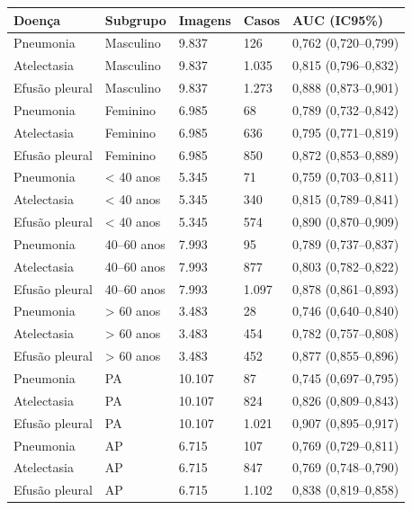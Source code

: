 \begin{tabular}{lllll}
\toprule
Doença & Subgrupo & Imagens & Casos & AUC (IC95\%) \\
\midrule
Pneumonia & Masculino & 9.837 & 126 & 0,762 (0,720–0,799) \\
Atelectasia & Masculino & 9.837 & 1.035 & 0,815 (0,796–0,832) \\
Efusão pleural & Masculino & 9.837 & 1.273 & 0,888 (0,873–0,901) \\
Pneumonia & Feminino & 6.985 & 68 & 0,789 (0,732–0,842) \\
Atelectasia & Feminino & 6.985 & 636 & 0,795 (0,771–0,819) \\
Efusão pleural & Feminino & 6.985 & 850 & 0,872 (0,853–0,889) \\
Pneumonia & < 40 anos & 5.345 & 71 & 0,759 (0,703–0,811) \\
Atelectasia & < 40 anos & 5.345 & 340 & 0,815 (0,789–0,841) \\
Efusão pleural & < 40 anos & 5.345 & 574 & 0,890 (0,870–0,909) \\
Pneumonia & 40–60 anos & 7.993 & 95 & 0,789 (0,737–0,837) \\
Atelectasia & 40–60 anos & 7.993 & 877 & 0,803 (0,782–0,822) \\
Efusão pleural & 40–60 anos & 7.993 & 1.097 & 0,878 (0,861–0,893) \\
Pneumonia & > 60 anos & 3.483 & 28 & 0,746 (0,640–0,840) \\
Atelectasia & > 60 anos & 3.483 & 454 & 0,782 (0,757–0,808) \\
Efusão pleural & > 60 anos & 3.483 & 452 & 0,877 (0,855–0,896) \\
Pneumonia & PA & 10.107 & 87 & 0,745 (0,697–0,795) \\
Atelectasia & PA & 10.107 & 824 & 0,826 (0,809–0,843) \\
Efusão pleural & PA & 10.107 & 1.021 & 0,907 (0,895–0,917) \\
Pneumonia & AP & 6.715 & 107 & 0,769 (0,729–0,811) \\
Atelectasia & AP & 6.715 & 847 & 0,769 (0,748–0,790) \\
Efusão pleural & AP & 6.715 & 1.102 & 0,838 (0,819–0,858) \\
\bottomrule
\end{tabular}
